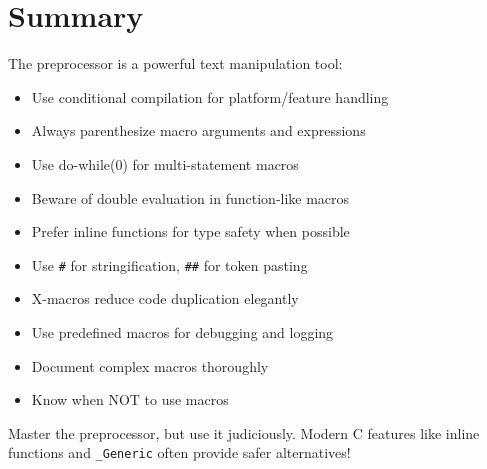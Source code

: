\section{Summary}

The preprocessor is a powerful text manipulation tool:

\begin{itemize}
    \item Use conditional compilation for platform/feature handling
    \item Always parenthesize macro arguments and expressions
    \item Use do-while(0) for multi-statement macros
    \item Beware of double evaluation in function-like macros
    \item Prefer inline functions for type safety when possible
    \item Use \texttt{\#} for stringification, \texttt{\#\#} for token pasting
    \item X-macros reduce code duplication elegantly
    \item Use predefined macros for debugging and logging
    \item Document complex macros thoroughly
    \item Know when NOT to use macros
\end{itemize}

Master the preprocessor, but use it judiciously. Modern C features like inline functions and \texttt{\_Generic} often provide safer alternatives!
